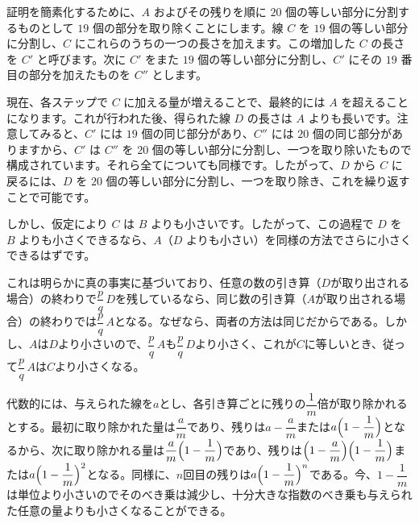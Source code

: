 \documentclass[a4paper,11pt,openany]{ltjsbook}
\begin{document}
証明を簡素化するために、$A$ およびその残りを順に $20$ 個の等しい部分に分割するものとして $19$ 個の部分を取り除くことにします。線 $C$ を $19$ 個の等しい部分に分割し、$C$ にこれらのうちの一つの長さを加えます。この増加した $C$ の長さを $C'$ と呼びます。次に $C'$ をまた $19$ 個の等しい部分に分割し、$C'$ にその $19$ 番目の部分を加えたものを $C''$ とします。

現在、各ステップで $C$ に加える量が増えることで、最終的には $A$ を超えることになります。これが行われた後、得られた線 $D$ の長さは $A$ よりも長いです。注意してみると、$C'$ には $19$ 個の同じ部分があり、$C''$ には $20$ 個の同じ部分がありますから、$C'$ は $C''$ を $20$ 個の等しい部分に分割し、一つを取り除いたもので構成されています。それら全てについても同様です。したがって、$D$ から $C$ に戻るには、$D$ を $20$ 個の等しい部分に分割し、一つを取り除き、これを繰り返すことで可能です。

しかし、仮定により $C$ は $B$ よりも小さいです。したがって、この過程で $D$ を $B$ よりも小さくできるなら、$A$（$D$ よりも小さい）を同様の方法でさらに小さくできるはずです。

これは明らかに真の事実に基づいており、任意の数の引き算（$D$が取り出される場合）の終わりで$\dfrac{p}{q}\, D$を残しているなら、同じ数の引き算（$A$が取り出される場合）の終わりでは$\dfrac{p}{q}\, A$となる。なぜなら、両者の方法は同じだからである。しかし、$A$は$D$より小さいので、$\dfrac{p}{q}\, A$も$\dfrac{p}{q}\, D$より小さく、これが$C$に等しいとき、従って$\dfrac{p}{q}\, A$は$C$より小さくなる。

代数的には、与えられた線を$a$とし、各引き算ごとに残りの$\dfrac{1}{m}$倍が取り除かれるとする。最初に取り除かれた量は$\dfrac{a}{m}$であり、残りは$a - \dfrac{a}{m}$または$a\Bigl(1 - \dfrac{1}{m}\Bigr)$となるから、次に取り除かれる量は$\dfrac{a}{m}\Bigl(1 - \dfrac{1}{m}\Bigr)$であり、残りは$\Bigl(1 - \dfrac{a}{m}\Bigr)\Bigl(1 - \dfrac{1}{m}\Bigr)$または$a\Bigl(1 - \dfrac{1}{m}\Bigr)^2$となる。同様に、$n$回目の残りは$a\Bigl(1 - \dfrac{1}{m}\Bigr)^n$である。今、$1 - \dfrac{1}{m}$は単位より小さいのでそのべき乗は減少し、十分大きな指数のべき乗も与えられた任意の量よりも小さくなることができる。
\end{document}
